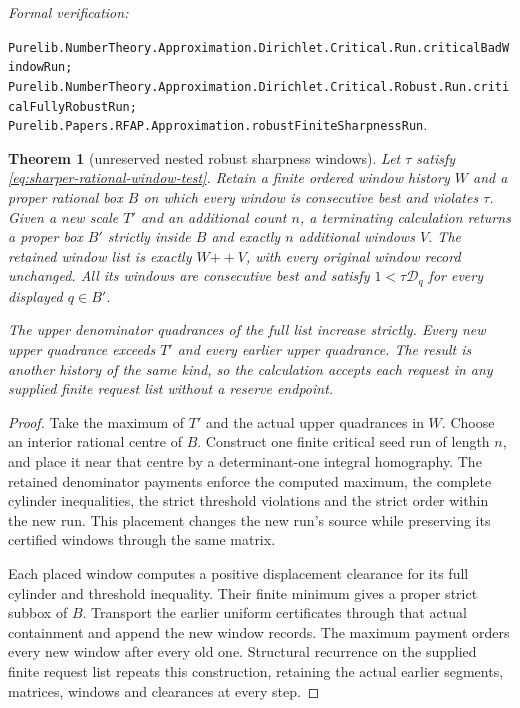 \documentclass[11pt]{article}
\newtheorem{theorem}{Theorem}[section]
\newcommand{\leanref}[1]{\par\smallskip\noindent
  \emph{Formal verification:}\par\nobreak
  {\raggedright\nolinkurl{#1}.\par}}
\begin{document}
\leanref{Purelib.NumberTheory.Approximation.Dirichlet.Critical.Run.criticalBadWindowRun;
Purelib.NumberTheory.Approximation.Dirichlet.Critical.Robust.Run.criticalFullyRobustRun;
Purelib.Papers.RFAP.Approximation.robustFiniteSharpnessRun}

\begin{theorem}[unreserved nested robust sharpness windows]
\label{thm:unreserved-nested-sharpness}
Let $\tau$ satisfy \eqref{eq:sharper-rational-window-test}. Retain a finite
ordered window history $W$ and a proper rational box $B$ on which every
window is consecutive best and violates $\tau$. Given a new scale $T'$ and
an additional count $n$, a terminating calculation returns a proper box
$B'$ strictly inside $B$ and exactly $n$ additional windows $V$. The
retained window list is exactly $W\mathbin{+\!\!+}V$, with every original
window record unchanged. All its windows are consecutive best and satisfy
$1<\tau\mathcal D_q$ for every displayed $q\in B'$.

The upper denominator quadrances of the full list increase strictly.
Every new upper quadrance exceeds $T'$ and every earlier upper quadrance.
The result is another history of the same kind, so the calculation accepts
each request in any supplied finite request list without a reserve endpoint.
\end{theorem}

\begin{proof}
Take the maximum of $T'$ and the actual upper quadrances in $W$. Choose an
interior rational centre of $B$. Construct one finite critical seed run of
length $n$, and place it near that centre by a determinant-one integral
homography. The retained denominator payments enforce the computed maximum,
the complete cylinder inequalities, the strict threshold violations and
the strict order within the new run. This placement changes the new run's
source while preserving its certified windows through the same matrix.

Each placed window computes a positive displacement clearance for its full
cylinder and threshold inequality. Their finite minimum gives a proper
strict subbox of $B$. Transport the earlier uniform certificates through
that actual containment and append the new window records. The maximum
payment orders every new window after every old one. Structural recurrence
on the supplied finite request list repeats this construction, retaining
the actual earlier segments, matrices, windows and clearances at every step.
\end{proof}
\end{document}
